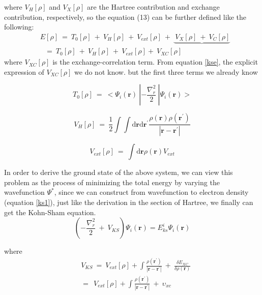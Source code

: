 \documentclass[a4paper]{report}
\begin{document}
\noindent where $V_\textit{H}[\rho]$ and $ V_\textit{X}[\rho] $ are the Hartree contribution and exchange contribution, respectively, so the equation (13) can be further defined like
 the following:
\begin{equation}\label{ccc}
\begin{split}
&E[\rho]\ = \ T_{0}[\rho] \ + \ V_\textit{H}[\rho] \ + \ V_\textit{ext}[\rho] \ + \ \underbrace{\ V_\textit{X}[\rho]  \ + \ V_\textit{C}[\rho]}  \\
&\ \ \ = \ T_{0}[\rho] \ + \ V_\textit{H}[\rho] \ + \ V_\textit{ext}[\rho] + \ V_\textit{XC}[\rho]
\end{split}\end{equation}
\noindent where $V_\textit{XC}[\rho]$  is the exchange-correlation term. From equation \ref{kse}, the explicit expression of $V_\textit{XC}[\rho]$ we do not know. 
 but the first three terms we already know

\begin{equation}
 T_{0}[\rho]\ = \ < \Psi_{i}(\textbf{r}) \ | -\frac{\nabla^{2}_{r}}{2} \ | \Psi_{i}(\textbf{r}) >
\end{equation}

\begin{equation}
V_\textit{H}[\rho] \ = \ \frac{1}{2} \int \int \mathrm{d} {\textbf{r}} \mathrm{d}{\textbf{r}^{\prime}} \frac{\rho({\textbf{r}})\rho(\textbf{r}^{\prime})}{|{\textbf{r}}-{\textbf{r}}^{\prime}|} 
\end{equation}


\begin{equation}
V_\textit{ext}[\rho]\ = \ \int \mathrm{d}{\textbf{r}} \rho(\textbf{r}) V_\textit{ext} 
\end{equation}

\noindent In order to derive the ground state of the above system, we can view this problem as the process of minimizing the total energy by varying the wavefunction $\Psi^*$, since
we can construct from wavefunction to electron density (equation \ref{ks1}), just like the derivation in the section of Hartree, we finally can get the Kohn-Sham equation.
\begin{equation}\label{aaa}
 (-\frac{\nabla^{2}_{r}}{2}\ + \ V_\textit{KS}) \Psi_{\textit{i}}(\textbf{r}) = E_{\textit{ks}}^{\textit{i}} \Psi_{\textit{i}}(\textbf{r})
\end{equation}

\noindent where
\begin{equation}\begin{split}
&\ V_\textit{KS} \ = \ V_\textit{ext}[\rho] + \int \frac{\rho(\textbf{r}^{\prime})}{|{\textbf{r}}-{\textbf{r}}^{\prime}|} \ + \ \frac{\delta{E_\textit{XC}}}{\delta{\rho(\textbf{r})}} \\
&\ = \ \ V_\textit{ext}[\rho] + \int \frac{\rho(\textbf{r}^{\prime})}{|{\textbf{r}}-{\textbf{r}}^{\prime}|} \ + \ \upsilon_\textit{xc}
\end{split}
\end{equation}
\end{document}
